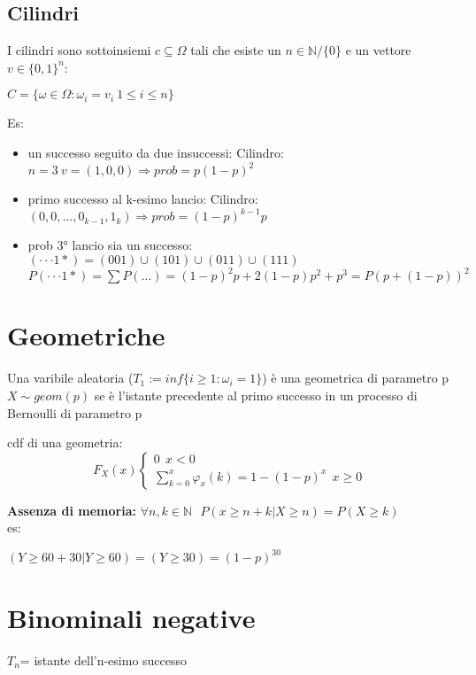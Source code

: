 \documentclass[11pt, letterpaper]{article}
\begin{document}
\subsection{Cilindri}
I cilindri sono sottoinsiemi $c\subseteq\Omega$ tali che esiste un $n\in\mathbb{N}/\{0\}$ e un vettore $v\in\{0,1\}^{n}$:
\begin{center}
    $C=\{\omega\in\Omega :\omega_{i}=v_{i}\ 1\leq i\leq n\}$
\end{center}
Es:
\begin{itemize}
    \item un successo seguito da due insuccessi:
    \subitem Cilindro: $n=3\ v=(1,0,0)\Rightarrow prob=p(1-p)^{2}$
    \item primo successo al k-esimo lancio:
    \subitem Cilindro: $(0,0,...,0_{k-1},1_{k})\Rightarrow prob=(1-p)^{k-1}p$
    \item prob 3° lancio sia un successo:
    \subitem $(\cdot\cdot\cdot 1*)=(001)\cup(101)\cup(011)\cup(111)$
    \subitem $P(\cdot\cdot\cdot 1*)=\sum P(...)=(1-p)^{2}p+2(1-p)p^{2}+p^{3}=P(p+(1-p))^{2}$ 
\end{itemize}

\section{Geometriche}
Una varibile aleatoria ($T_{1}:=inf\{i\geq 1: \omega_{i}=1\}$) è una geometrica di parametro p $X\sim geom(p)$
se è l'istante precedente al primo successo in un processo di Bernoulli di parametro p

cdf di una geometria:
\begin{equation}
    F_{X}(x)
  \begin{cases}
    0\ \ x<0\\
    \sum_{k=0}^{x} \varphi_{x}(k)=1-(1-p)^{x}\ \ x \geq 0
  \end{cases}
\end{equation}

\textbf{Assenza di memoria:} $\forall n,k\in\mathbb{N}\ \ \ P(x\geq n+k|X\geq n)=P(X\geq k)$\\
es:
\begin{center}
    $(Y\geq 60+30|Y\geq 60)=(Y\geq 30)=(1-p)^{30}$
\end{center}

\section{Binominali negative}
$T_{n}$= istante dell'n-esimo successo
\end{document}
